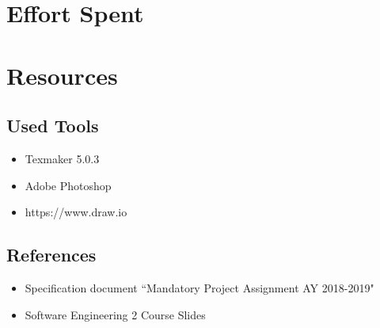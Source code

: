\documentclass{article}
\begin{document}
\section{Effort Spent}
\section{Resources}
\subsection{Used Tools}
\begin{itemize}
\item Texmaker 5.0.3
\item Adobe Photoshop
\item https://www.draw.io
\end{itemize}
\subsection{References}
\begin{itemize}
\item Specification document “Mandatory Project Assignment AY 2018-2019"
\item Software Engineering 2 Course Slides
\end{itemize}
\newpage
\end{document}

